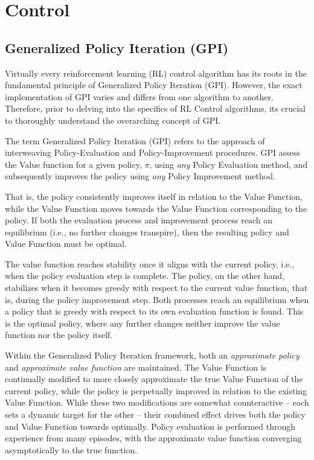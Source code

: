 \section{Control}
\subsection{Generalized Policy Iteration (GPI)}
 Virtually every reinforcement learning (RL) control algorithm has its roots in the fundamental principle of Generalized Policy Iteration (GPI). 
 However, the exact implementation of GPI varies and differs from one algorithm to another. 
 Therefore, prior to delving into the specifics of RL Control algorithms, its crucial to thoroughly understand the overarching concept of GPI. 

The term Generalized Policy Iteration (GPI) refers to the approach of interweaving Policy-Evaluation and Policy-Improvement procedures. 
GPI assess the Value function for a given policy, $\pi$, using \textit{any} Policy Evaluation method, and subsequently improves the policy using \textit{any} Policy Improvement method.

That is, the policy consistently improves itself in relation to the Value Function, while the Value Function moves towards the Value Function corresponding to the policy.
If both the evaluation process and improvement process reach an equilibrium (i.e., no further changes transpire), then the resulting policy and Value Function must be optimal. 

The value function reaches stability once it aligns with the current policy, i.e., when the policy evaluation step is complete. The policy, on the other hand, stabilizes when it becomes greedy with respect to the current value function, that is, during the policy improvement step. Both processes reach an equilibrium when a policy that is greedy with respect to its own evaluation function is found. This is the optimal policy, where any further changes neither improve the value function nor the policy itself.

Within the Generalized Policy Iteration framework, both an \textit{approximate policy} and \textit{approximate value function} are maintained. The Value Function is continually modified to more closely approximate the true Value Function of the current policy, while the policy is perpetually improved in relation to the existing Value Function.  While these two modifications are somewhat counteractive -- each sets a dynamic target for the other --  their combined effect drives both the policy and Value Function towards optimally. 
Policy evaluation is performed through experience from many episodes, with the approximate value function converging asymptotically to the true function.


